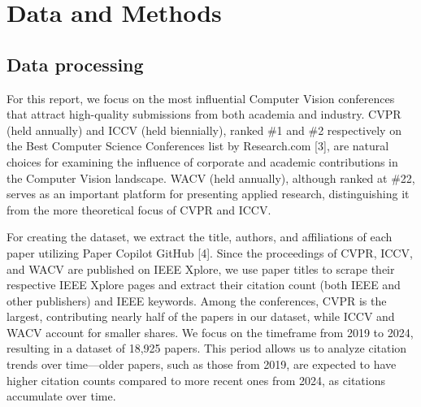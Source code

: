 \documentclass{article}
\begin{document}
\section{Data and Methods}
\vspace{-5pt}
\subsection{Data processing}
For this report, we focus on the most influential Computer Vision conferences that attract high-quality submissions from both academia and industry. CVPR (held annually) and ICCV (held biennially), ranked \#1 and \#2 respectively on the Best Computer Science Conferences list by Research.com [3], are natural choices for examining the influence of corporate and academic contributions in the Computer Vision landscape. WACV (held annually), although ranked at \#22, serves as an important platform for presenting applied research, distinguishing it from the more theoretical focus of CVPR and ICCV. 

For creating the dataset, we extract the title, authors, and affiliations of each paper utilizing Paper Copilot GitHub [4]. Since the proceedings of CVPR, ICCV, and WACV are published on IEEE Xplore, we use paper titles to scrape their respective IEEE Xplore pages and extract their citation count (both IEEE and other publishers) and IEEE keywords. Among the conferences, CVPR is the largest, contributing nearly half of the papers in our dataset, while ICCV and WACV account for smaller shares. We focus on the timeframe from 2019 to 2024, resulting in a dataset of 18,925 papers. This period allows us to analyze citation trends over time—older papers, such as those from 2019, are expected to have higher citation counts compared to more recent ones from 2024, as citations accumulate over time.
\end{document}
